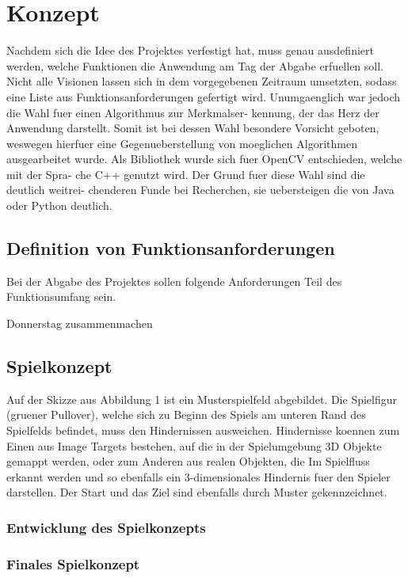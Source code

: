\chapter{Konzept}
\label{sec:conzept}
Nachdem sich die Idee des Projektes verfestigt hat, muss genau ausdefiniert werden, welche Funktionen die Anwendung am Tag der Abgabe erfuellen soll. Nicht alle Visionen lassen sich in dem vorgegebenen Zeitraum umsetzten, sodass eine Liste aus Funktionsanforderungen gefertigt wird.
Unumgaenglich war jedoch die Wahl fuer einen Algorithmus zur Merkmalser- kennung, der das Herz der Anwendung darstellt. Somit ist bei dessen Wahl besondere Vorsicht geboten, weswegen hierfuer eine Gegenueberstellung von moeglichen Algorithmen ausgearbeitet wurde.
Als Bibliothek wurde sich fuer OpenCV entschieden, welche mit der Spra- che C++ genutzt wird. Der Grund fuer diese Wahl sind die deutlich weitrei- chenderen Funde bei Recherchen, sie uebersteigen die von Java oder Python deutlich.


\section{Definition von Funktionsanforderungen}
Bei der Abgabe des Projektes sollen folgende Anforderungen Teil des Funktionsumfang sein.

Donnerstag zusammenmachen
\section{Spielkonzept}
Auf der Skizze aus Abbildung 1 ist ein Musterspielfeld abgebildet. Die Spielfigur (gruener Pullover), welche sich zu Beginn des Spiels am unteren Rand des Spielfelds befindet, muss den Hindernissen ausweichen. Hindernisse koennen zum Einen aus Image Targets bestehen, auf die in der Spielumgebung 3D Objekte gemappt werden, oder zum Anderen aus realen Objekten, die Im Spielfluss erkannt werden und so ebenfalls ein 3-dimensionales Hindernis fuer den Spieler darstellen. Der Start und das Ziel sind ebenfalls durch Muster gekennzeichnet.

\subsection{Entwicklung des Spielkonzepts}
\subsection{Finales Spielkonzept}